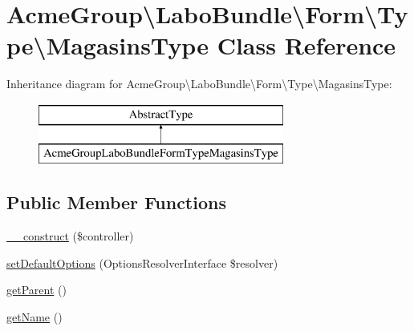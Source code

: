 \hypertarget{class_acme_group_1_1_labo_bundle_1_1_form_1_1_type_1_1_magasins_type}{\section{Acme\+Group\textbackslash{}Labo\+Bundle\textbackslash{}Form\textbackslash{}Type\textbackslash{}Magasins\+Type Class Reference}
\label{class_acme_group_1_1_labo_bundle_1_1_form_1_1_type_1_1_magasins_type}
}
Inheritance diagram for Acme\+Group\textbackslash{}Labo\+Bundle\textbackslash{}Form\textbackslash{}Type\textbackslash{}Magasins\+Type\+:\begin{figure}[H]
\begin{center}
\leavevmode
\includegraphics[height=2.000000cm]{class_acme_group_1_1_labo_bundle_1_1_form_1_1_type_1_1_magasins_type}
\end{center}
\end{figure}
\subsection*{Public Member Functions}
\begin{DoxyCompactItemize}
\item 
\hyperlink{class_acme_group_1_1_labo_bundle_1_1_form_1_1_type_1_1_magasins_type_a6a910aa0d74e4c1f8daeca45966aba62}{\+\_\+\+\_\+construct} (\$controller)
\item 
\hyperlink{class_acme_group_1_1_labo_bundle_1_1_form_1_1_type_1_1_magasins_type_a91ea29f4c834930ca541eaf70260f07c}{set\+Default\+Options} (Options\+Resolver\+Interface \$resolver)
\item 
\hyperlink{class_acme_group_1_1_labo_bundle_1_1_form_1_1_type_1_1_magasins_type_a232ff837ccb452c657689a321e63a151}{get\+Parent} ()
\item 
\hyperlink{class_acme_group_1_1_labo_bundle_1_1_form_1_1_type_1_1_magasins_type_ad966683e98cd645460691ab5e3b1fedb}{get\+Name} ()
\end{DoxyCompactItemize}


